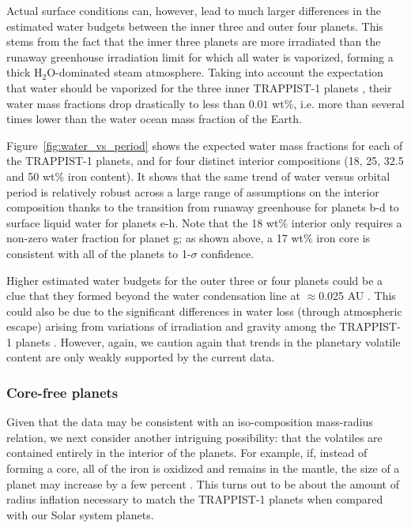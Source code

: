 \documentclass[twocolumn]{aastex63}
\begin{document}
Actual surface conditions can, however, lead to much larger differences in the estimated water budgets between the inner three and outer four planets. This stems from the fact that the inner three planets are more irradiated than the runaway greenhouse irradiation limit \citep{Kopparapu2013,Wolf2017,Turbet2018} for which all water is vaporized, forming a thick H$_2$O-dominated steam atmosphere. Taking into account the expectation that water should be vaporized for the three inner TRAPPIST-1 planets \citep{Turbet2019,Turbet2020}, their water mass fractions drop drastically to less than $0.01$ wt\%, i.e. more than several times lower than the water ocean mass fraction of the Earth.

Figure~\ref{fig:water_vs_period} shows the expected water mass fractions for each of the TRAPPIST-1 planets, and for four distinct interior compositions (18, 25, 32.5 and 50 wt\% iron content). It shows that the same trend of water versus orbital period is relatively robust across a large range of assumptions on the interior composition thanks to the transition from runaway greenhouse for planets b-d to surface liquid water for planets e-h.  Note that the 18 wt\% interior only requires a non-zero water fraction for planet g;  as shown above, a 17 wt\% iron core is consistent with all of the planets to 1-$\sigma$ confidence.

Higher estimated water budgets for the outer three or four planets could be a clue that they formed beyond the water condensation line at $\approx$0.025 AU \citep{Unterborn2018a}. This could also be due to the significant differences in water loss (through atmospheric escape) arising from variations of irradiation and gravity among the TRAPPIST-1 planets \citep{Lissauer2007, Bolmont2017,Bourrier2017}.  However, again, we caution again that trends in the planetary volatile content are only weakly supported by the current data.

\subsubsection{Core-free planets} \label{sec:core_free}

Given that the data may be consistent with an iso-composition mass-radius relation, we next consider another intriguing possibility:
that the volatiles are contained entirely in the interior of the planets.  For example, if, instead of forming a core, all of the iron is oxidized and remains in the mantle, the size of a planet may increase by a few percent \citep{ElkinsTanton2008}.  This turns out to be about the amount of radius inflation necessary to match the TRAPPIST-1 planets when compared with our Solar system planets.
\end{document}
